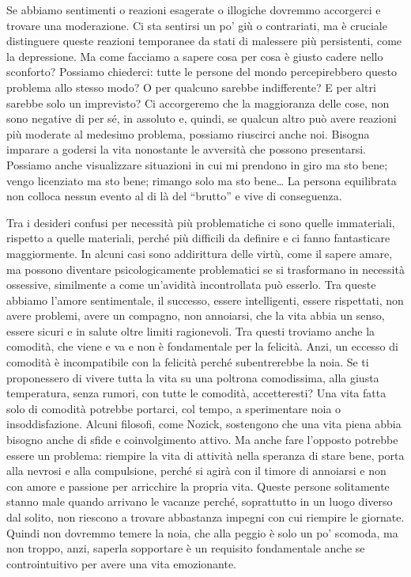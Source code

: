 \documentclass[12pt]{book} %
\begin{document}
Se abbiamo sentimenti o reazioni esagerate o illogiche dovremmo accorgerci e trovare una moderazione. Ci sta sentirsi
un po' giù o contrariati, ma è cruciale distinguere queste reazioni temporanee da stati di malessere più persistenti, come la depressione. Ma come
facciamo a sapere cosa per cosa è giusto cadere nello sconforto? Possiamo chiederci: tutte le persone del mondo
percepirebbero questo problema allo stesso modo? O per qualcuno sarebbe indifferente? E per altri sarebbe solo un
imprevisto? Ci accorgeremo che la maggioranza delle cose, non sono negative di per sé, in assoluto e, quindi,
se qualcun altro può avere reazioni più moderate al medesimo problema, possiamo riuscirci anche noi. Bisogna imparare a
godersi la vita nonostante le avversità che possono presentarsi. Possiamo anche visualizzare situazioni in cui mi prendono in giro ma sto bene;
vengo licenziato ma sto bene; rimango solo ma sto bene… La persona equilibrata non colloca nessun evento al di là del
“brutto” e vive di conseguenza.

Tra i desideri confusi per necessità più problematiche ci sono quelle immateriali, rispetto a quelle materiali, perché
più difficili da definire e ci fanno fantasticare maggiormente. In alcuni casi sono addirittura delle virtù, come il
sapere amare, ma possono diventare psicologicamente problematici se si trasformano in necessità ossessive, similmente a come un'avidità incontrollata può esserlo. Tra queste abbiamo
l'amore sentimentale, il successo, essere intelligenti, essere rispettati, non avere problemi,
avere un compagno, non annoiarsi, che la vita abbia un senso, essere sicuri e in salute oltre limiti ragionevoli. Tra
questi troviamo anche la comodità, che viene e va e non è fondamentale per la felicità. Anzi, un eccesso di comodità è
incompatibile con la felicità perché subentrerebbe la noia. Se ti proponessero di vivere tutta la vita su una poltrona
comodissima, alla giusta temperatura, senza rumori, con tutte le comodità, accetteresti? 
Una vita fatta solo di comodità potrebbe portarci, col tempo, a sperimentare noia o insoddisfazione. Alcuni filosofi, come Nozick, sostengono che una vita piena abbia bisogno anche di sfide e coinvolgimento attivo. Ma anche fare l'opposto potrebbe essere un problema:
riempire la vita di attività nella speranza di stare bene, porta alla nevrosi e alla compulsione, perché si agirà con
il timore di annoiarsi e non con amore e passione per arricchire la propria vita. Queste persone solitamente stanno
male quando arrivano le vacanze perché, soprattutto in un luogo diverso dal solito, non riescono a trovare abbastanza
impegni con cui riempire le giornate. Quindi non dovremmo temere la noia, che alla peggio è solo un
po' scomoda, ma non troppo, anzi, saperla sopportare è un requisito fondamentale anche se
controintuitivo per avere una vita emozionante.
\end{document}
